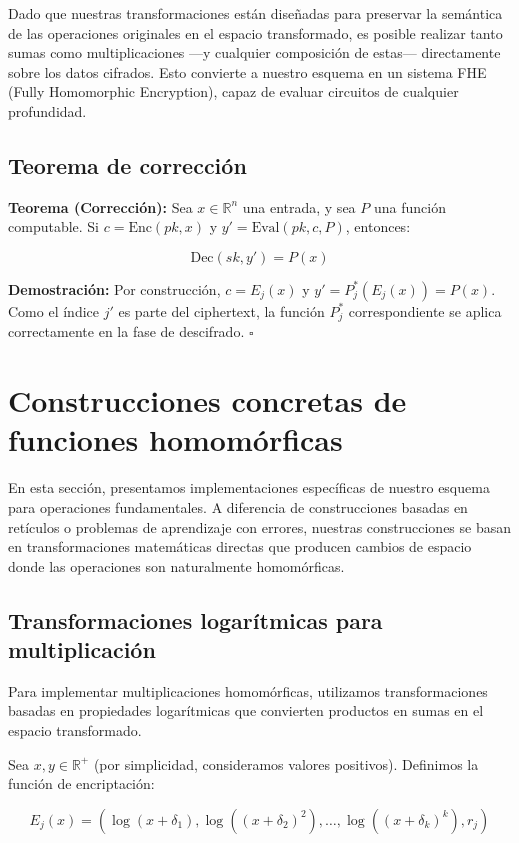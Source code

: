 \documentclass[11pt]{article}
\theoremstyle{plain}
\begin{document}
Dado que nuestras transformaciones están diseñadas para preservar la semántica de las operaciones originales en el espacio transformado, es posible realizar tanto sumas como multiplicaciones —y cualquier composición de estas— directamente sobre los datos cifrados. Esto convierte a nuestro esquema en un sistema FHE (Fully Homomorphic Encryption), capaz de evaluar circuitos de cualquier profundidad.

\subsection{Teorema de corrección}

\textbf{Teorema (Corrección):} Sea $x \in \mathbb{R}^n$ una entrada, y sea $P$ una función computable. Si $c = \text{Enc}(pk, x)$ y $y' = \text{Eval}(pk, c, P)$, entonces:

\[
\text{Dec}(sk, y') = P(x)
\]

\textbf{Demostración:} Por construcción, $c = E_j(x)$ y $y' = P^*_j(E_j(x)) = P(x)$. Como el índice $j'$ es parte del ciphertext, la función $P^*_j$ correspondiente se aplica correctamente en la fase de descifrado. \hfill$\square$

\section{Construcciones concretas de funciones homom\'orficas}

En esta secci\'on, presentamos implementaciones espec\'ificas de nuestro esquema para operaciones fundamentales. A diferencia de construcciones basadas en ret\'iculos o problemas de aprendizaje con errores, nuestras construcciones se basan en transformaciones matem\'aticas directas que producen cambios de espacio donde las operaciones son naturalmente homom\'orficas.

\subsection{Transformaciones logar\'itmicas para multiplicaci\'on}

Para implementar multiplicaciones homom\'orficas, utilizamos transformaciones basadas en propiedades logar\'itmicas que convierten productos en sumas en el espacio transformado.

Sea $x, y \in \mathbb{R}^+$ (por simplicidad, consideramos valores positivos). Definimos la funci\'on de encriptaci\'on:

\begin{equation}
E_j(x) = (\log(x + \delta_1), \log((x + \delta_2)^2), \ldots, \log((x + \delta_k)^k), r_j)
\end{equation}
\end{document}
